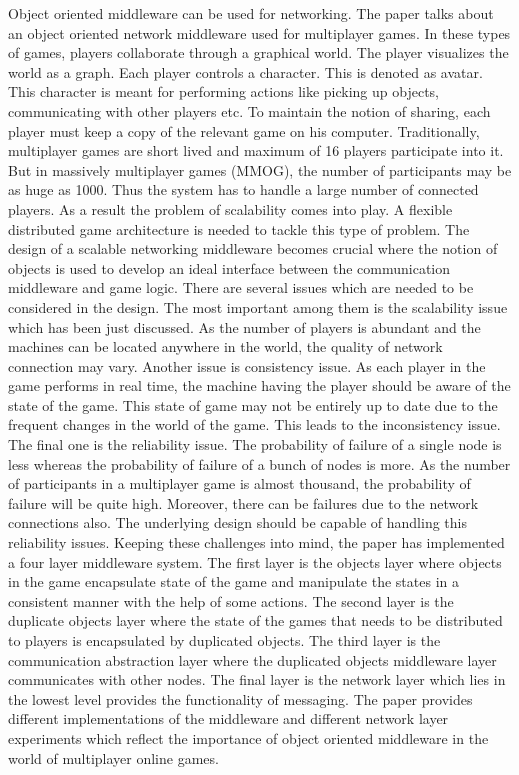 \documentclass{acm_proc_article-sp}
\begin{document}
Object oriented middleware can be used for networking. The paper \cite{Denault:2008p1} talks about an object oriented network middleware used for multiplayer games. In these types of games, players collaborate through a graphical world. The player visualizes the world as a graph. Each player controls a character. This is denoted as avatar. This character is meant for performing actions like picking up objects, communicating with other players etc. To maintain the notion of sharing, each player must keep a copy of the relevant game on his computer. Traditionally, multiplayer games are short lived and maximum of 16 players participate into it. But in massively multiplayer games (MMOG), the number of participants may be as huge as 1000. Thus the system has to handle a large number of connected players. As a result the problem of scalability comes into play. A flexible distributed game architecture is needed to tackle this type of problem. The design of a scalable networking middleware becomes crucial where the notion of objects is used to develop an ideal interface between the communication middleware and game logic.
There are several issues which are needed to be considered in the design. The most important among them is the scalability issue which has been just discussed. As the number of players is abundant and the machines can be located anywhere in the world, the quality of network connection may vary. Another issue is consistency issue. As each player in the game performs in real time, the machine having the player should be aware of the state of the game. This state of game may not be entirely up to date due to the frequent changes in the world of the game. This leads to the inconsistency issue. The final one is the reliability issue. The probability of failure of a single node is less whereas the probability of failure of a bunch of nodes is more. As the number of participants in a multiplayer game is almost thousand, the probability of failure will be quite high. Moreover, there can be failures due to the network connections also. The underlying design should be capable of handling this reliability issues.
Keeping these challenges into mind, the paper has implemented a four layer middleware system. The first layer is the objects layer where objects in the game encapsulate state of the game and manipulate the states in a consistent manner with the help of some actions. The second layer is the duplicate objects layer where the state of the games that needs to be distributed to players is encapsulated by duplicated objects. The third layer is the communication abstraction layer where the duplicated objects middleware layer communicates with other nodes. The final layer is the network layer which lies in the lowest level provides the functionality of messaging. The paper provides different implementations of the middleware and different network layer experiments which reflect the importance of object oriented middleware in the world of multiplayer online games.
\end{document}
